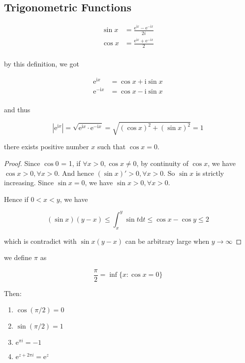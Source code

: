 \subsection{Trigonometric Functions}

\begin{definition}
    \begin{align*}
        \sin x &= \frac{\mathrm{e}^{\mathrm{i} x} - \mathrm{e}^{- \mathrm{i} x}}{2i} \\
        \cos x &= \frac{\mathrm{e}^{\mathrm{i} x} + \mathrm{e}^{- \mathrm{i} x}}{2} \\
    \end{align*}

    by this definition, we got

    \begin{align*}
        \mathrm{e}^{\mathrm{i} x} &= \cos x + \mathrm{i} \sin x \\
        \mathrm{e}^{- \mathrm{i} x} &= \cos x - \mathrm{i} \sin x \\
    \end{align*}

    and thus


    \[
        \left| \mathrm{e}^{\mathrm{i} x} \right| = \sqrt{\mathrm{e}^{\mathrm{i} x} \cdot \mathrm{e}^{- \mathrm{i} x}} = \sqrt{(\cos x)^2 + (\sin x)^2}  = 1
    \]
\end{definition}

\begin{thm}
    there exists positive number $x$ such that $\cos x = 0$.
\end{thm}

\begin{proof}
    Since $\cos 0$ = 1, if $\forall x > 0, \cos x \ne 0$, by continuity of $\cos x$, we have $\cos x > 0, \forall x >0$.
    And hence $(\sin x)' > 0, \forall x > 0$. So $\sin x$ is strictly increasing.
    Since $\sin x = 0$, we have $\sin x > 0, \forall x >0$.

    Hence if $0 < x <y$, we have

    \[
        (\sin x)(y-x) \le \int_{x}^{y} \sin t \mathrm{d}t \le \cos x - \cos y \le 2
    \]

    which is contradict with $\sin x(y-x)$ can be arbitrary large when $y \to \infty$
\end{proof}

\begin{thm}
    we define $\pi$ as

    \[
        \frac{\pi}{2} =  \inf \{ x: \cos x = 0 \}
    \]

    Then:

    \begin{enumerate}
        \item $\cos (\pi / 2) = 0$
        \item $\sin (\pi/2) = 1$
        \item $\mathrm{e}^{\pi i} = -1$
        \item $\mathrm{e}^{z + 2\pi i} = \mathrm{e}^z$
    \end{enumerate}
\end{thm}

